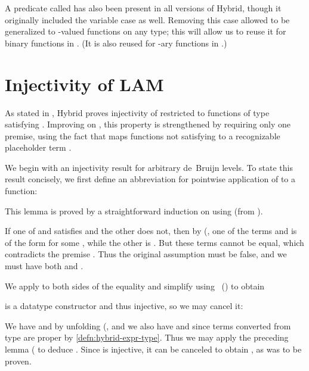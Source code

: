 \documentclass[copyright,creativecommons]{eptcs}
\begin{document}
A predicate called  has also been present in all versions of
Hybrid, though it originally included the variable case as well.
Removing this case allowed  to be generalized to -valued
functions on any type; this will allow us to reuse it for binary functions in
.  (It is also reused for -ary
functions in \cite[Sect.~3.3]{martin:2010a}.)


\section{Injectivity of \ldquo LAM\rdquo}
\label{sec:hybrid-defn-LAM-inject}

As stated in , Hybrid proves injectivity of
 restricted to functions of type  satisfying
.  Improving on \cite{ambler/crole/momigliano:2002}, this property
is strengthened by requiring only one  premise, using the fact
that  maps functions not satisfying  to a recognizable
placeholder term .

We begin with an injectivity result for arbitrary de~Bruijn levels.
To state this result concisely, we first define an abbreviation 
for pointwise application of  to a function:

\begin{Defn}
\label{defn:hybrid-Level} \formal
\par\nopagebreak[3]

\end{Defn}

\begin{Lem}
\label{lem:hybrid-abstr-lbind-inject} \formal
\par\nopagebreak 
\end{Lem}

This lemma is proved by a straightforward  induction on
 using 
(from ).

\begin{Theo}[Injectivity of ]
\label{theo:hybrid-LAM-inject} \formal

\end{Theo}

\begin{Proof}
If one of  and  satisfies  and the other does not,
then by  (, one of the terms
 and  is of the form
 for some , while the other is .
But these terms cannot be equal, which contradicts the premise
.  Thus the original assumption must be false,
and we must have both  and .

We apply  to both sides of the equality 
and simplify using \ ()
to obtain
  
 is a datatype constructor and thus injective, so we may cancel it:
  
We have  and  by
unfolding  (, and we also have
 and  since terms
converted from type  are proper by \autoref{defn:hybrid-expr-type}.
Thus we may apply the preceding lemma ( to deduce
.  Since  is injective, it can be canceled
to obtain , as was to be proven.
\end{Proof}
\end{document}
